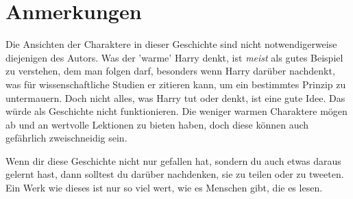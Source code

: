 


\section*{Anmerkungen}
Die Ansichten der Charaktere in dieser Geschichte sind nicht notwendigerweise diejenigen des Autors. Was der 'warme' Harry denkt, ist \emph{meist} als gutes Beispiel zu verstehen, dem man folgen darf, besonders wenn Harry darüber nachdenkt, was für wissenschaftliche Studien er zitieren kann, um ein bestimmtes Prinzip zu untermauern. Doch nicht alles, was Harry tut oder denkt, ist eine gute Idee. Das würde als Geschichte nicht funktionieren. Die weniger warmen Charaktere mögen ab und an wertvolle Lektionen zu bieten haben, doch diese können auch gefährlich zweischneidig sein.


Wenn dir diese Geschichte nicht nur gefallen hat, sondern du auch etwas daraus gelernt hast, dann solltest du darüber nachdenken, sie zu teilen oder zu tweeten. Ein Werk wie dieses ist nur so viel wert, wie es Menschen gibt, die es lesen.
